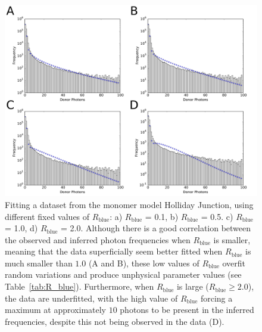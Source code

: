 \begin{figure}
   \begin{center}
      \includegraphics*[clip=true, width=6in]{sizing/vary_Rblue.pdf}
      \caption{Fitting a dataset from the monomer model Holliday Junction, using different fixed values of $R_{\text{blue}}$: a) $R_{\text{blue}}$ = 0.1, b) $R_{\text{blue}}$ = 0.5. c) $R_{\text{blue}}$ = 1.0, d) $R_{\text{blue}}$ = 2.0. Although there is a good correlation between the observed and inferred photon frequencies when $R_{\text{blue}}$ is smaller, meaning that the data superficially seem better fitted when $R_{\text{blue}}$ is much smaller than $1.0$ (A and B), these low values of $R_{\text{blue}}$ overfit random variations and produce unphysical parameter values (see Table~\ref{tab:R_blue}). Furthermore, when $R_{\text{blue}}$ is large ($R_{\text{blue}} \ge 2.0$), the data are underfitted, with the high value of $R_{\text{blue}}$ forcing a maximum at approximately $10$ photons to be present in the inferred frequencies, despite this not being observed in the data (D).} 
      \label{fig:vary_Rblue}
   \end{center}
\end{figure}

